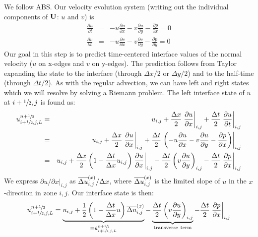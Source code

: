 We follow ABS.  Our velocity evolution system (writing out the
individual components of ${\bf U}$: $u$ and $v$) is
\begin{eqnarray}
\frac{\partial u}{\partial t} &=& -u \frac{\partial u}{\partial x} 
                                  -v \frac{\partial u}{\partial y} 
                                  -\frac{\partial p}{\partial x} = 0 \\
\frac{\partial v}{\partial t} &=& -u \frac{\partial v}{\partial x} 
                                  -v \frac{\partial v}{\partial y} 
                                  -\frac{\partial p}{\partial y} = 0 
\end{eqnarray}
Our goal in this step is to predict time-centered interface values of
the normal velocity ($u$ on x-edges and $v$ on y-edges).  The
prediction follows from Taylor expanding the state to the interface
(through $\Delta x/2$ or $\Delta y/2$) and to the half-time (through
$\Delta t/2$).  As with the regular advection, we can have left and
right states which we will resolve by solving a Riemann problem.  The
left interface state of $u$ at $i+{\sfrac{1}{2}},j$ is found as:
\begin{eqnarray}
u_{i+{\sfrac{1}{2}},j,L}^{n+{\sfrac{1}{2}}} 
  &=& u_{i,j} 
    + \frac{\Delta x}{2} \left . \frac{\partial u}{\partial x} \right |_{i,j}
    + \frac{\Delta t}{2} \left . \frac{\partial u}{\partial t} \right |_{i,j}\\
  &=& u_{i,j} 
    + \frac{\Delta x}{2} \left . \frac{\partial u}{\partial x} \right |_{i,j}
    + \frac{\Delta t}{2} \left . \left (-u \frac{\partial u}{\partial x}
                                -v \frac{\partial u}{\partial y}
                                -\frac{\partial p}{\partial x} \right ) \right |_{i,j}\\
  &=& u_{i,j} 
    + \frac{\Delta x}{2} \left ( 1 - \frac{\Delta t}{\Delta x} u_{i,j} \right )
                         \left .  \frac{\partial u}{\partial x}\right |_{i,j}
    - \frac{\Delta t}{2} \left ( v \frac{\partial u}{\partial y}\right )_{i,j}
    - \frac{\Delta t}{2} \left . \frac{\partial p}{\partial x} \right |_{i,j}\\
\end{eqnarray}
We express ${\partial u}/{\partial x} |_{i,j}$ as $\overline{\Delta u}^{(x)}_{i,j} / \Delta
x$, where $\overline{\Delta u}^{(x)}_{i,j}$ is the limited slope of $u$ in the
$x$-direction in zone $i,j$.  Our interface state is then:
\begin{equation}
u_{i+{\sfrac{1}{2}},j,L}^{n+{\sfrac{1}{2}}} 
    = \underbrace{u_{i,j} + \frac{1}{2} \left ( 1 - \frac{\Delta t}{\Delta x} u \right ) \overline{\Delta u}^{(x)}_{i,j}}_{\equiv \hat{u}_{i+{\sfrac{1}{2}},j,L}^{n+{\sfrac{1}{2}}}}
    - \underbrace{\frac{\Delta t}{2} \left ( v \frac{\partial u}{\partial y} \right )_{i,j}}_{\mathrm{transverse~term}}
    - \frac{\Delta t}{2} \left . \frac{\partial p}{\partial x} \right |_{i,j}
\label{eq:uMAC_l}
\end{equation} 


